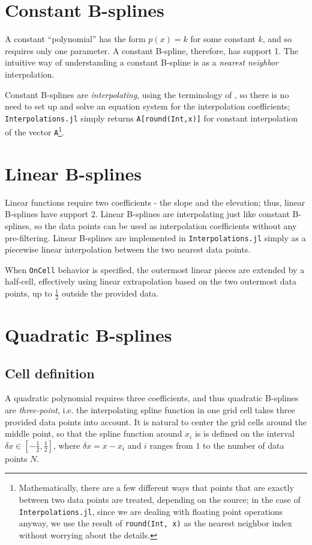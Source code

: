 \documentclass{article}
\begin{document}
\section{Constant B-splines}

A constant ``polynomial'' has the form $p(x) = k$ for some constant $k$, and so requires only one parameter. A constant B-spline, therefore, has support 1. The intuitive way of understanding a constant B-spline is as a \emph{nearest neighbor} interpolation.

Constant B-splines are \emph{interpolating}, using the terminology of \citet{875199}, so there is no need to set up and solve an equation system for the interpolation coefficients; \texttt{Interpolations.jl} simply returns \texttt{A[round(Int,x)]} for constant interpolation of the vector \texttt{A}\footnote{Mathematically, there are a few different ways that points that are exactly between two data points are treated, depending on the source; in the case of \texttt{Interpolations.jl}, since we are dealing with floating point operations anyway, we use the result of \texttt{round(Int, x)} as the nearest neighbor index without worrying about the details.}.

\section{Linear B-splines}

Linear functions require two coefficients - the slope and the elevation; thus, linear B-splines have support 2. Linear B-splines are interpolating just like constant B-splines, so the data points can be used as interpolation coefficients without any pre-filtering. Linear B-splines are implemented in \texttt{Interpolations.jl} simply as a piecewise linear interpolation between the two nearest data points.

When \texttt{OnCell} behavior is specified, the outermost linear pieces are extended by a half-cell, effectively using linear extrapolation based on the two outermost data points, up to $\frac{1}{2}$ outside the provided data.

\section{Quadratic B-splines}

\subsection{Cell definition}
A quadratic polynomial requires three coefficients, and thus quadratic B-splines are \emph{three-point}, i.e. the interpolating spline function in one grid cell takes three provided data points into account. It is natural to center the grid cells around the middle point, so that the spline function around $x_i$ is is defined on the interval $\delta x \in [-\frac{1}{2}, \frac{1}{2}]$, where $\delta x = x - x_i$ and $i$ ranges from $1$ to the number of data points $N$.
\end{document}
